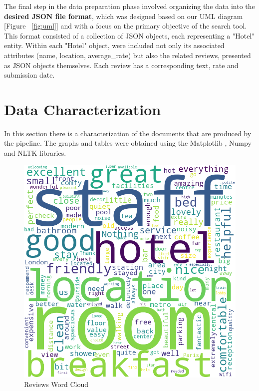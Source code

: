 \documentclass[sigconf]{acmart}
\begin{document}
The final step in the data preparation phase involved organizing the data into the \textbf{desired JSON file format}, which was designed based on our UML diagram [Figure ~\ref{fig:uml}] and with a focus on the primary objective of the search tool. This format consisted of a collection of JSON objects, each representing a "Hotel" entity. Within each "Hotel" object, were included not only its associated attributes (name, location, average\_rate) but also the related reviews, presented as JSON objects themselves. Each review has a corresponding text, rate and submission date.

\section{Data Characterization}

In this section there is a characterization of the documents that are produced by the pipeline. The graphs and tables were obtained using the Matplotlib \cite{Matplotlib}, Numpy \cite{Numpy} and NLTK \cite{NLTK} libraries.



\begin{figure}[h]
  \centering
  \includegraphics[width=\linewidth]{imgs/reviews_wordcloud.png}
  \caption{Reviews Word Cloud}
  \label{fig:wordcloud}
\end{figure}
\end{document}
